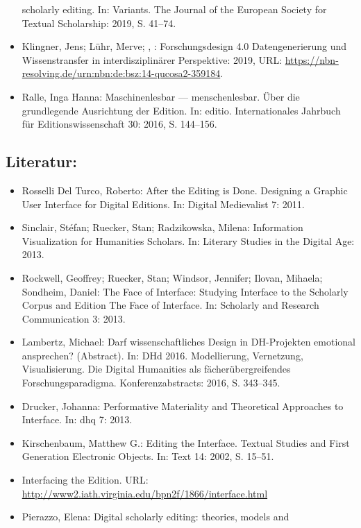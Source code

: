 \documentclass{article}
\begin{document}
\begin{itemize}
                              scholarly editing. In: Variants. The Journal of the European Society for
                              Textual Scholarship: 2019, S. 41–74.\item Klingner, Jens; Lühr, Merve; , : Forschungsdesign 4.0 Datengenerierung und
                              Wissenstransfer in interdisziplinärer Perspektive: 2019, URL: \url{https://nbn-resolving.de/urn:nbn:de:bsz:14-qucosa2-359184}.\item Ralle, Inga Hanna: Maschinenlesbar — menschenlesbar. Über die grundlegende
                              Ausrichtung der Edition. In: editio. Internationales Jahrbuch für
                              Editionswissenschaft 30: 2016, S. 144–156.\end{itemize}\subsection*{Literatur:}\begin{itemize}\item Rosselli Del Turco, Roberto: After the Editing is Done. Designing a Graphic User
                              Interface for Digital Editions. In: Digital Medievalist 7: 2011.\item Sinclair, Stéfan; Ruecker, Stan; Radzikowska, Milena: Information Visualization for Humanities
                              Scholars. In: Literary Studies in the Digital Age: 2013.\item Rockwell, Geoffrey; Ruecker, Stan; Windsor, Jennifer; Ilovan, Mihaela; Sondheim, Daniel: The Face of Interface: Studying Interface to the
                              Scholarly Corpus and Edition The Face of Interface. In: Scholarly and Research Communication 3: 2013.\item Lambertz, Michael: Darf wissenschaftliches Design in DH-Projekten emotional
                              ansprechen? (Abstract). In: DHd 2016. Modellierung, Vernetzung, Visualisierung. Die
                              Digital Humanities als fächerübergreifendes Forschungsparadigma.
                              Konferenzabstracts: 2016, S. 343–345.\item Drucker, Johanna: Performative Materiality and Theoretical Approaches to
                              Interface. In: dhq 7: 2013.\item Kirschenbaum, Matthew G.: Editing the Interface. Textual Studies and First
                              Generation Electronic Objects. In: Text 14: 2002, S. 15–51.\item Interfacing the Edition. URL: \url{http://www2.iath.virginia.edu/bpn2f/1866/interface.html}\item Pierazzo, Elena: Digital scholarly editing: theories, models and

\end{itemize}
\end{document}
